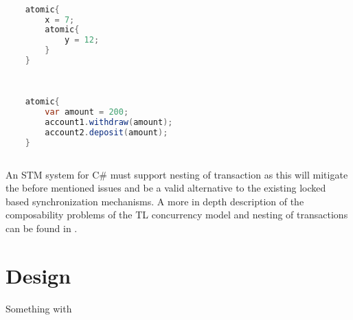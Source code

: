 \begin{lstlisting}[label=lst:stm_nested_transactions,
  caption={Lexically nested transactions},
  language=Java,  
  showspaces=false,
  showtabs=false,
  breaklines=true,
  showstringspaces=false,
  breakatwhitespace=true,
  commentstyle=\color{greencomments},
  keywordstyle=\color{bluekeywords},
  stringstyle=\color{redstrings},
  morekeywords={atomic, retry, orElse, var}]  % Start your code-block

	atomic{
		x = 7;
		atomic{
			y = 12;		
		}
	}
       
\end{lstlisting}

\begin{lstlisting}[label=lst:stm_nested_transactions_real,
  caption={Dynamically nested transactions},
  language=Java,  
  showspaces=false,
  showtabs=false,
  breaklines=true,
  showstringspaces=false,
  breakatwhitespace=true,
  commentstyle=\color{greencomments},
  keywordstyle=\color{bluekeywords},
  stringstyle=\color{redstrings},
  morekeywords={atomic, retry, orElse, var}]  % Start your code-block

	atomic{
		var amount = 200;
		account1.withdraw(amount);
		account2.deposit(amount);
	}
       
\end{lstlisting}

An \ac{STM} system for C\# must support nesting of transaction as this will mitigate the before mentioned issues and be a valid alternative to the existing locked based synchronization mechanisms. A more in depth description of the composability problems of the \ac{TL} concurrency model and nesting of transactions can be found in \cite{dpt907e14trending}.




\section{Design}
\label{sec:stm_design}
Something with\cite[p. 1]{harris2003language}




